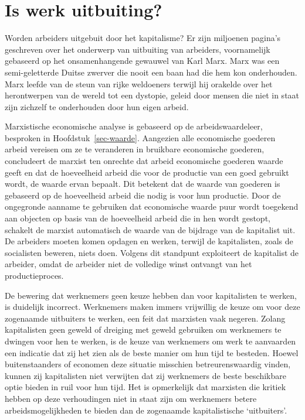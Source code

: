 \documentclass[
  a5paper,
  smalldemyvopaper,11pt,twoside,onecolumn,openright,extrafontsizes,
hidelinks]{memoir}
\begin{document}
\section{Is werk uitbuiting?}\label{is-werk-uitbuiting}

Worden arbeiders uitgebuit door het kapitalisme? Er zijn miljoenen
pagina's geschreven over het onderwerp van uitbuiting van arbeiders,
voornamelijk gebaseerd op het onsamenhangende gewauwel van Karl Marx.
Marx was een semi-geletterde Duitse zwerver die nooit een baan had die
hem kon onderhouden. Marx leefde van de steun van rijke weldoeners
terwijl hij orakelde over het herontwerpen van de wereld tot een
dystopie, geleid door mensen die niet in staat zijn zichzelf te
onderhouden door hun eigen arbeid.

Marxistische economische analyse is gebaseerd op de arbeidswaardeleer,
besproken in Hoofdstuk~\ref{sec-waarde}. Aangezien alle economische
goederen arbeid vereisen om ze te veranderen in bruikbare economische
goederen, concludeert de marxist ten onrechte dat arbeid economische
goederen waarde geeft en dat de hoeveelheid arbeid die voor de productie
van een goed gebruikt wordt, de waarde ervan bepaalt. Dit betekent dat
de waarde van goederen is gebaseerd op de hoeveelheid arbeid die nodig
is voor hun productie. Door de ongegronde aanname te gebruiken dat
economische waarde puur wordt toegekend aan objecten op basis van de
hoeveelheid arbeid die in hen wordt gestopt, schakelt de marxist
automatisch de waarde van de bijdrage van de kapitalist uit. De
arbeiders moeten komen opdagen en werken, terwijl de kapitalisten, zoals
de socialisten beweren, niets doen. Volgens dit standpunt exploiteert de
kapitalist de arbeider, omdat de arbeider niet de volledige winst
ontvangt van het productieproces.

De bewering dat werknemers geen keuze hebben dan voor kapitalisten te
werken, is duidelijk incorrect. Werknemers maken immers vrijwillig de
keuze om voor deze zogenaamde uitbuiters te werken, een feit dat
marxisten vaak negeren. Zolang kapitalisten geen geweld of dreiging met
geweld gebruiken om werknemers te dwingen voor hen te werken, is de
keuze van werknemers om werk te aanvaarden een indicatie dat zij het
zien als de beste manier om hun tijd te besteden. Hoewel buitenstaanders
of economen deze situatie misschien betreurenswaardig vinden, kunnen zij
kapitalisten niet verwijten dat zij werknemers de beste beschikbare
optie bieden in ruil voor hun tijd. Het is opmerkelijk dat marxisten die
kritiek hebben op deze verhoudingen niet in staat zijn om werknemers
betere arbeidsmogelijkheden te bieden dan de zogenaamde kapitalistische
`uitbuiters'.
\end{document}
